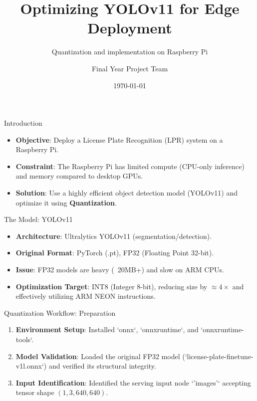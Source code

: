 \documentclass{beamer}
\title{Optimizing YOLOv11 for Edge Deployment}
\subtitle{Quantization and implementation on Raspberry Pi}
\author{Final Year Project Team}
\date{\today}
\begin{document}
\begin{frame}
    \titlepage
\end{frame}

\begin{frame}{Introduction}
    \begin{itemize}
        \item \textbf{Objective}: Deploy a License Plate Recognition (LPR) system on a Raspberry Pi.
        \item \textbf{Constraint}: The Raspberry Pi has limited compute (CPU-only inference) and memory compared to desktop GPUs.
        \item \textbf{Solution}: Use a highly efficient object detection model (YOLOv11) and optimize it using \textbf{Quantization}.
    \end{itemize}
\end{frame}

\begin{frame}{The Model: YOLOv11}
    \begin{itemize}
        \item \textbf{Architecture}: Ultralytics YOLOv11 (segmentation/detection).
        \item \textbf{Original Format}: PyTorch (.pt), FP32 (Floating Point 32-bit).
        \item \textbf{Issue}: FP32 models are heavy (~20MB+) and slow on ARM CPUs.
        \item \textbf{Optimization Target}: INT8 (Integer 8-bit), reducing size by $\approx 4\times$ and effectively utilizing ARM NEON instructions.
    \end{itemize}
\end{frame}

\begin{frame}{Quantization Workflow: Preparation}
    \begin{enumerate}
        \item \textbf{Environment Setup}: Installed `onnx`, `onnxruntime`, and `onnxruntime-tools`.
        \item \textbf{Model Validation}: Loaded the original FP32 model (`license-plate-finetune-v1l.onnx`) and verified its structural integrity.
        \item \textbf{Input Identification}: Identified the serving input node `'images'` accepting tensor shape $(1, 3, 640, 640)$.
    \end{enumerate}
\end{frame}
\end{document}
